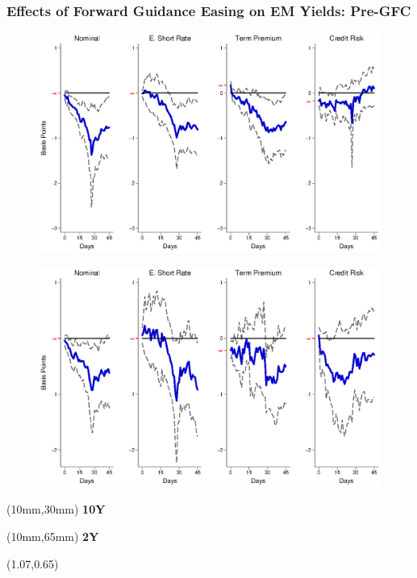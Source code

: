 \documentclass[12pt, aspectratio=169, xcolor=dvipsnames]{beamer}
\begin{document}
\begin{frame}[label=FGEMpre]
\frametitle{Effects of Forward Guidance Easing on EM Yields: Pre-GFC}
\begin{figure}[!htbp]
	\begin{center} %
		\includegraphics[trim={0cm 0cm 0cm 0cm},clip,height=0.45\textheight,width=0.85\linewidth]{../Figures/LPs/LagDep-FX/Path/EM/PathEMnomyptpphi120mPre.eps}
		\par\end{center}
\end{figure}
\vspace{-0.5cm}
\begin{figure}[!htbp]
	\begin{center} %
		\includegraphics[trim={0cm 0cm 0cm 0.76cm},clip,height=0.45\textheight,width=0.85\linewidth]{../Figures/LPs/LagDep-FX/Path/EM/PathEMnomyptpphi24mPre.eps}
		\par\end{center}
\end{figure}
\begin{textblock*}{8mm}(10mm,30mm)
	\small \textbf{10Y}
\end{textblock*}
\begin{textblock*}{8mm}(10mm,65mm)
	\small \textbf{2Y}
\end{textblock*}
\begin{textblock*}{5cm}(1.07\textwidth,0.65\textheight)
	\hyperlink{FGUSpre}{}
\end{textblock*}
\end{frame}
\end{document}
